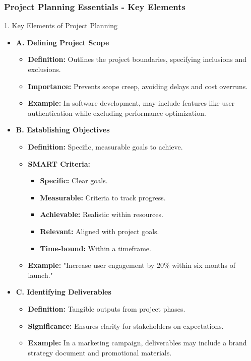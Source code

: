 \documentclass[aspectratio=169]{beamer}
\begin{document}
\begin{frame}[fragile]
    \frametitle{Project Planning Essentials - Key Elements}
    
    \begin{block}{1. Key Elements of Project Planning}
        \begin{itemize}
            \item \textbf{A. Defining Project Scope}
            \begin{itemize}
                \item \textbf{Definition:} Outlines the project boundaries, specifying inclusions and exclusions.
                \item \textbf{Importance:} Prevents scope creep, avoiding delays and cost overruns.
                \item \textbf{Example:} In software development, may include features like user authentication while excluding performance optimization.
            \end{itemize}
            
            \item \textbf{B. Establishing Objectives}
            \begin{itemize}
                \item \textbf{Definition:} Specific, measurable goals to achieve.
                \item \textbf{SMART Criteria:}
                \begin{itemize}
                    \item \textbf{Specific:} Clear goals.
                    \item \textbf{Measurable:} Criteria to track progress.
                    \item \textbf{Achievable:} Realistic within resources.
                    \item \textbf{Relevant:} Aligned with project goals.
                    \item \textbf{Time-bound:} Within a timeframe.
                \end{itemize}
                \item \textbf{Example:} "Increase user engagement by 20\% within six months of launch."
            \end{itemize}
    
            \item \textbf{C. Identifying Deliverables}
            \begin{itemize}
                \item \textbf{Definition:} Tangible outputs from project phases.
                \item \textbf{Significance:} Ensures clarity for stakeholders on expectations.
                \item \textbf{Example:} In a marketing campaign, deliverables may include a brand strategy document and promotional materials.
            \end{itemize}
        \end{itemize}
    \end{block}
\end{frame}
\end{document}

